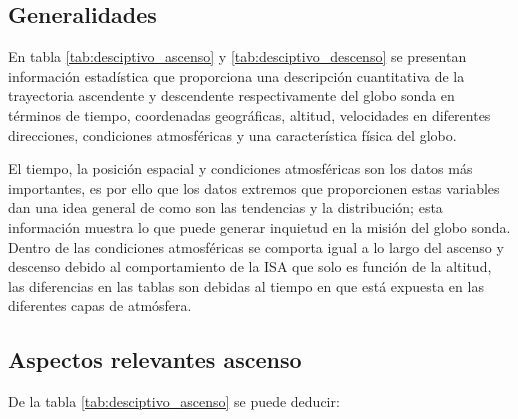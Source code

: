 \begin{landscape}

    
      
    
\end{landscape}

  
\subsection{Generalidades}

En tabla \ref{tab:desciptivo_ascenso} y  \ref{tab:desciptivo_descenso} se presentan información estadística que proporciona una descripción cuantitativa de la trayectoria ascendente y descendente respectivamente del globo sonda en términos de tiempo, coordenadas geográficas, altitud, velocidades en diferentes direcciones, condiciones atmosféricas y una característica física del globo.

El tiempo, la posición espacial y condiciones atmosféricas son los datos más importantes, es por ello que los datos extremos que proporcionen estas variables dan una idea general de como son las tendencias y la distribución; esta información muestra lo que puede generar inquietud en la misión del globo sonda. Dentro de las condiciones atmosféricas se comporta igual a lo largo del ascenso y descenso debido al comportamiento de la ISA que solo es función de la altitud, las diferencias en las tablas son debidas al tiempo en que está expuesta en las diferentes capas de atmósfera. 


\subsection{Aspectos relevantes ascenso}

De la tabla \ref{tab:desciptivo_ascenso} se puede deducir:
    
